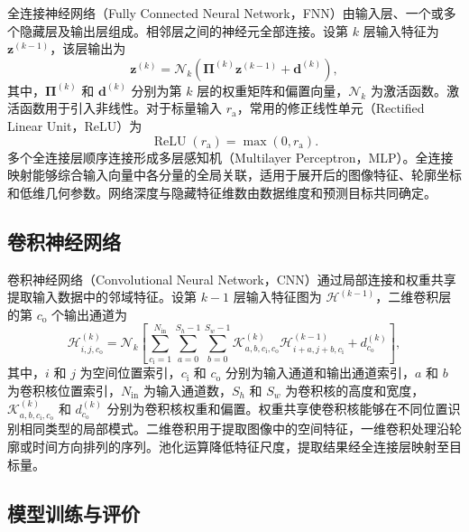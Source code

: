 全连接神经网络（Fully Connected Neural Network，FNN）由输入层、一个或多个隐藏层及输出层组成。相邻层之间的神经元全部连接。设第 $k$ 层输入特征为 $\boldsymbol{z}^{(k-1)}$，该层输出为
\begin{equation}
\boldsymbol{z}^{(k)}
=
\mathcal{N}_k
\left(%
\boldsymbol{\Pi}^{(k)}\boldsymbol{z}^{(k-1)}
+
\boldsymbol{d}^{(k)}
\right),
\label{eq:ch2_fully_connected_layer}
\end{equation}
其中，$\boldsymbol{\Pi}^{(k)}$ 和 $\boldsymbol{d}^{(k)}$ 分别为第 $k$ 层的权重矩阵和偏置向量，$\mathcal{N}_k$ 为激活函数。激活函数用于引入非线性。对于标量输入 $r_{\mathrm a}$，常用的修正线性单元（Rectified Linear Unit，ReLU）为
\begin{equation}
\operatorname{ReLU}(r_{\mathrm a})
=
\max(0,r_{\mathrm a}).
\label{eq:ch2_relu}
\end{equation}
多个全连接层顺序连接形成多层感知机（Multilayer Perceptron，MLP）。全连接映射能够综合输入向量中各分量的全局关联，适用于展开后的图像特征、轮廓坐标和低维几何参数。网络深度与隐藏特征维数由数据维度和预测目标共同确定\cite{lecun2015deeplearning}。

\subsection{卷积神经网络}
\label{subsec:ch2_cnn}

卷积神经网络（Convolutional Neural Network，CNN）通过局部连接和权重共享提取输入数据中的邻域特征。设第 $k-1$ 层输入特征图为 $\mathcal{H}^{(k-1)}$，二维卷积层的第 $c_{\mathrm o}$ 个输出通道为
\begin{equation}
\mathcal{H}_{i,j,c_{\mathrm o}}^{(k)}
=
\mathcal{N}_k
\left[
\sum_{c_{\mathrm i}=1}^{N_{\mathrm{in}}}
\sum_{a=0}^{S_h-1}
\sum_{b=0}^{S_w-1}
\mathcal{K}_{a,b,c_{\mathrm i},c_{\mathrm o}}^{(k)}
\mathcal{H}_{i+a,j+b,c_{\mathrm i}}^{(k-1)}
+
d_{c_{\mathrm o}}^{(k)}
\right],
\label{eq:ch2_convolution}
\end{equation}
其中，$i$ 和 $j$ 为空间位置索引，$c_{\mathrm i}$ 和 $c_{\mathrm o}$ 分别为输入通道和输出通道索引，$a$ 和 $b$ 为卷积核位置索引，$N_{\mathrm{in}}$ 为输入通道数，$S_h$ 和 $S_w$ 为卷积核的高度和宽度，$\mathcal{K}_{a,b,c_{\mathrm i},c_{\mathrm o}}^{(k)}$ 和 $d_{c_{\mathrm o}}^{(k)}$ 分别为卷积核权重和偏置。权重共享使卷积核能够在不同位置识别相同类型的局部模式。二维卷积用于提取图像中的空间特征，一维卷积处理沿轮廓或时间方向排列的序列。池化运算降低特征尺度，提取结果经全连接层映射至目标量\cite{krizhevsky2012imagenet,lecun2015deeplearning}。

\subsection{模型训练与评价}
\label{subsec:ch2_training}

